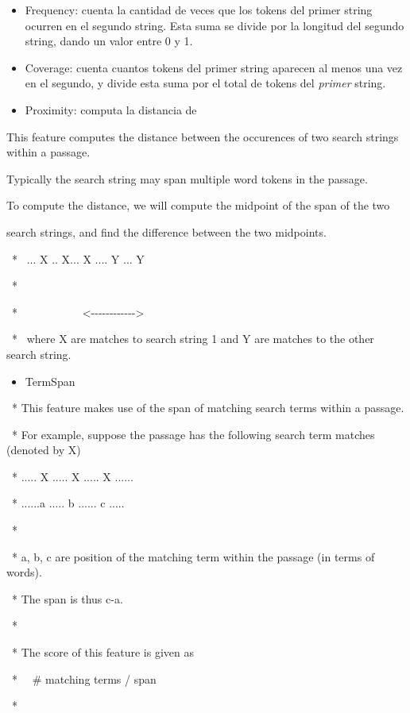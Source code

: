 \begin{itemize}
\item Frequency: cuenta la cantidad de veces que los tokens del primer
string ocurren en el segundo string. Esta suma se divide por la
longitud del segundo string, dando un valor entre 0 y 1.
\item Coverage: cuenta cuantos tokens del primer string aparecen al
menos una vez en el segundo, y divide esta suma por el total de tokens
del \textit{primer} string.
\item Proximity: computa la distancia de 
\end{itemize}
This feature computes the distance between the occurences of two search
strings within a passage.

Typically the search string may span multiple word tokens in the
passage. 

To compute the distance, we will compute the midpoint of the span of the
two

search strings, and find the difference between the two midpoints. 

\ * \ ... X .. X... X .... Y ... Y

\ * \ \ \ \ \ \ \ \ \ \ {\textbar} \ \ \ \ \ \ \ \ \ \ \ \ \ {\textbar}

\ *
\ \ \ \ \ \ \ \ \ \ \ {\textless}-{}-{}-{}-{}-{}-{}-{}-{}-{}-{}-{}-{\textgreater}

\ * \ where X are matches to search string 1 and Y are matches to the
other search string.


\begin{itemize}
\item TermSpan
\end{itemize}
\ * This feature makes use of the span of matching search terms within a
passage.

\ * For example, suppose the passage has the following search term
matches (denoted by X)

\ * ..... X ..... X ..... X ......

\ * ......a ..... b ...... c .....

\ * 

\ * a, b, c are position of the matching term within the passage (in
terms of words).

\ * The span is thus {\textbar}c-a{\textbar}.

\ * 

\ * The score of this feature is given as 

\ * \ \ \# matching terms / span

\ * 

